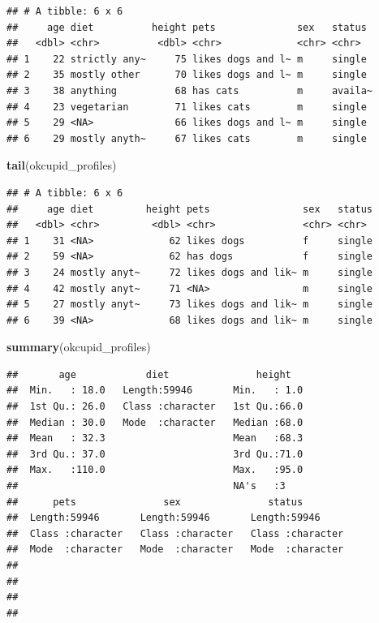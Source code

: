 \documentclass[
]{krantz}
\makeatletter
\newenvironment{Shaded}{\begin{snugshade}}{\end{snugshade}}
\newcommand{\KeywordTok}[1]{\textcolor[rgb]{0.27,0.27,0.27}{\textbf{#1}}}
\newcommand{\NormalTok}[1]{#1}
\newenvironment{kframe}{%
\medskip{}
\setlength{\fboxsep}{.8em}
 \def\at@end@of@kframe{}%
 \ifinner\ifhmode%
  \def\at@end@of@kframe{\end{minipage}}%
  \begin{minipage}{\columnwidth}%
 \fi\fi%
 \def\FrameCommand##1{\hskip\@totalleftmargin \hskip-\fboxsep
 \colorbox{shadecolor}{##1}\hskip-\fboxsep
     \hskip-\linewidth \hskip-\@totalleftmargin \hskip\columnwidth}%
 \MakeFramed {\advance\hsize-\width
   \@totalleftmargin\z@ \linewidth\hsize
   \@setminipage}}%
 {\par\unskip\endMakeFramed%
 \at@end@of@kframe}
\renewenvironment{Shaded}{\begin{kframe}}{\end{kframe}}
\makeatother
\begin{document}
\begin{verbatim}
## # A tibble: 6 x 6
##     age diet          height pets              sex   status 
##   <dbl> <chr>          <dbl> <chr>             <chr> <chr>  
## 1    22 strictly any~     75 likes dogs and l~ m     single 
## 2    35 mostly other      70 likes dogs and l~ m     single 
## 3    38 anything          68 has cats          m     availa~
## 4    23 vegetarian        71 likes cats        m     single 
## 5    29 <NA>              66 likes dogs and l~ m     single 
## 6    29 mostly anyth~     67 likes cats        m     single
\end{verbatim}

\begin{Shaded}
\begin{Highlighting}[]
\KeywordTok{tail}\NormalTok{(okcupid_profiles)}
\end{Highlighting}
\end{Shaded}

\begin{verbatim}
## # A tibble: 6 x 6
##     age diet         height pets                sex   status
##   <dbl> <chr>         <dbl> <chr>               <chr> <chr> 
## 1    31 <NA>             62 likes dogs          f     single
## 2    59 <NA>             62 has dogs            f     single
## 3    24 mostly anyt~     72 likes dogs and lik~ m     single
## 4    42 mostly anyt~     71 <NA>                m     single
## 5    27 mostly anyt~     73 likes dogs and lik~ m     single
## 6    39 <NA>             68 likes dogs and lik~ m     single
\end{verbatim}

\begin{Shaded}
\begin{Highlighting}[]
\KeywordTok{summary}\NormalTok{(okcupid_profiles)}
\end{Highlighting}
\end{Shaded}

\begin{verbatim}
##       age            diet               height    
##  Min.   : 18.0   Length:59946       Min.   : 1.0  
##  1st Qu.: 26.0   Class :character   1st Qu.:66.0  
##  Median : 30.0   Mode  :character   Median :68.0  
##  Mean   : 32.3                      Mean   :68.3  
##  3rd Qu.: 37.0                      3rd Qu.:71.0  
##  Max.   :110.0                      Max.   :95.0  
##                                     NA's   :3     
##      pets               sex               status         
##  Length:59946       Length:59946       Length:59946      
##  Class :character   Class :character   Class :character  
##  Mode  :character   Mode  :character   Mode  :character  
##                                                          
##                                                          
##                                                          
## 
\end{verbatim}
\end{document}
